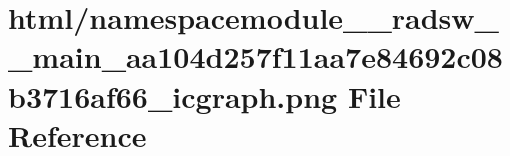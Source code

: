 \hypertarget{namespacemodule____radsw____main__aa104d257f11aa7e84692c08b3716af66__icgraph_8png}{}\section{html/namespacemodule\+\_\+\+\_\+radsw\+\_\+\+\_\+main\+\_\+aa104d257f11aa7e84692c08b3716af66\+\_\+icgraph.png File Reference}
\label{namespacemodule____radsw____main__aa104d257f11aa7e84692c08b3716af66__icgraph_8png}
